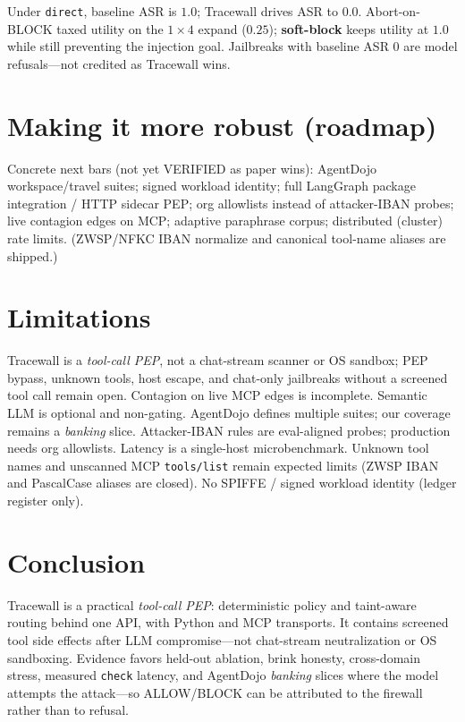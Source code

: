\documentclass[conference]{IEEEtran}
\begin{document}
Under \texttt{direct}, baseline ASR is $1.0$; Tracewall drives ASR to $0.0$.
Abort-on-BLOCK taxed utility on the $1{\times}4$ expand ($0.25$); \textbf{soft-block}
keeps utility at $1.0$ while still preventing the injection goal.
Jailbreaks with baseline ASR $0$ are model refusals---not credited as Tracewall wins.

\section{Making it more robust (roadmap)}
Concrete next bars (not yet VERIFIED as paper wins):
AgentDojo workspace/travel suites; signed workload identity;
full LangGraph package integration / HTTP sidecar PEP;
org allowlists instead of attacker-IBAN probes; live contagion edges on MCP;
adaptive paraphrase corpus; distributed (cluster) rate limits.
(ZWSP/NFKC IBAN normalize and canonical tool-name aliases are shipped.)

\section{Limitations}

Tracewall is a \emph{tool-call PEP}, not a chat-stream scanner or OS sandbox; PEP bypass,
unknown tools, host escape, and chat-only jailbreaks without a screened tool call remain open.
Contagion on live MCP edges is incomplete. Semantic LLM is optional and non-gating.
AgentDojo defines multiple suites; our coverage remains a \emph{banking} slice.
Attacker-IBAN rules are eval-aligned probes; production needs org allowlists.
Latency is a single-host microbenchmark.
Unknown tool names and unscanned MCP \texttt{tools/list} remain expected limits
(ZWSP IBAN and PascalCase aliases are closed).
No SPIFFE / signed workload identity (ledger register only).

\section{Conclusion}

Tracewall is a practical \emph{tool-call PEP}: deterministic policy and taint-aware routing
behind one API, with Python and MCP transports. It contains screened tool side effects after
LLM compromise---not chat-stream neutralization or OS sandboxing. Evidence favors held-out
ablation, brink honesty, cross-domain stress, measured \texttt{check} latency, and AgentDojo
\emph{banking} slices where the model attempts the attack---so ALLOW/BLOCK can be attributed
to the firewall rather than to refusal.
\end{document}
